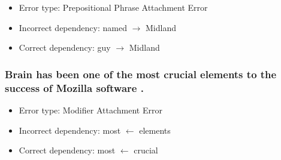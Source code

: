 \documentclass[12pt, letterpaper]{article}
\begin{document}
\begin{itemize}
  \item Error type: Prepositional Phrase Attachment Error
  \item Incorrect dependency: named $\rightarrow$ Midland
  \item Correct dependency: guy $\rightarrow$ Midland
\end{itemize}

\subsubsection{Brain has been one of the most crucial elements to the success of Mozilla software .}

\begin{itemize}
  \item Error type: Modifier Attachment Error
  \item Incorrect dependency: most $\leftarrow$ elements
  \item Correct dependency: most $\leftarrow$ crucial
\end{itemize}
\end{document}
